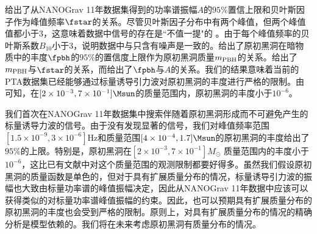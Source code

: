 给出了从NANOGrav 11年数据集得到的功率谱振幅$A$的$95\%$置信上限和贝叶斯因子作为峰值频率$\fstar$的关系。尽管贝叶斯因子分布中有两个峰值，但两个峰值值都小于$3$，这意味着数据中信号的存在是``不值一提"的 \cite{BF}。由于每个峰值频率的贝叶斯系数$B_{10}$小于$3$，说明数据中与只含有噪声是一致的。给出了原初黑洞在暗物质中的丰度$\fpbh$的$95\%$的置信度上限作为原初黑洞质量$m_{\rm{PBH}}$的关系。给出了$m_{\rm{PBH}}$与$\fstar$的关系，而给出了$\fpbh$与$A$的关系。我们的结果意味着当前的PTA数据集已经能够通过标量诱导引力波对原初黑洞的丰度进行严格的限制。由可知，在$[2\times 10^{-3}, 7\times 10^{-1}] \Msun$的质量范围内，原初黑洞的丰度小于$10^{-6}$。


我们首次在NANOGrav 11年数据集中搜索伴随着原初黑洞形成而不可避免产生的标量诱导力波的信号。由于没有发现显著的信号，我们对峰值频率范围$[1.5\times 10^{-9}, 3\times 10^{-6}]$Hz和质量范围$[4\times10^{-4}, 1.7]\Msun$的原初黑洞的丰度给出了$95\%$的上限。特别是，原初黑洞在$[2 \times 10^{-3}, 7\times 10^{-1}] M_\odot$ 质量范围内的丰度小于$10^{-6}$，这比已有文献中对这个质量范围的观测限制都要好得多。虽然我们假设原初黑洞的质量函数是单色的，但对于具有扩展质量分布的情况，标量诱导引力波的振幅也大致由标量功率谱的峰值振幅决定，因此从NANOGrav 11年数据中应该可以获得类似的对标量功率谱峰值振幅的约束。因此，也可以预期具有扩展质量分布的原初黑洞的丰度也会受到严格的限制。原则上，对具有扩展质量分布的情况的精确分析是模型依赖的。我们将在未来考虑原初黑洞有质量分布的情况。





